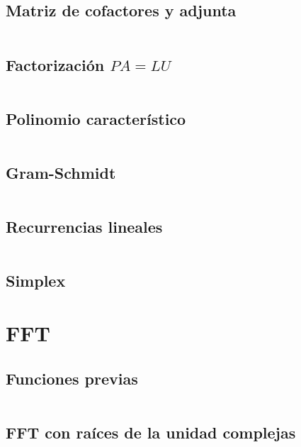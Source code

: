 \documentclass[11pt]{article}
\begin{document}
		\subsection{Matriz de cofactores y adjunta}
		\inputminted[tabsize=2,breaklines,firstline=341,lastline=376,fontsize=\small]{c++}{matrix.cpp}
		
		\subsection{Factorización $PA=LU$}
		\inputminted[tabsize=2,breaklines,firstline=378,lastline=394,fontsize=\small]{c++}{matrix.cpp}
		
		\subsection{Polinomio característico}
		\inputminted[tabsize=2,breaklines,firstline=396,lastline=406,fontsize=\small]{c++}{matrix.cpp}
		
		\subsection{Gram-Schmidt}
		\inputminted[tabsize=2,breaklines,firstline=408,lastline=422,fontsize=\small]{c++}{matrix.cpp}
		
		\subsection{Recurrencias lineales}
		\inputminted[tabsize=2,breaklines,firstline=7,lastline=42,fontsize=\small]{c++}{recurrence.cpp}
		
		\subsection{Simplex}
		
	\newpage
	\section{FFT}
		\subsection{Funciones previas}
		\inputminted[tabsize=2,breaklines,firstline=3,lastline=11,fontsize=\small]{c++}{fft.cpp}
		
		\subsection{FFT con raíces de la unidad complejas}
		\inputminted[tabsize=2,breaklines,firstline=13,lastline=44,fontsize=\small]{c++}{fft.cpp}
		
\end{document}
